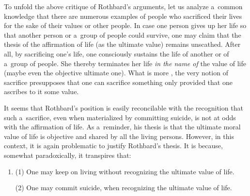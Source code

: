 To unfold the above critique of Rothbard's arguments, let us analyze a~common knowledge that there are numerous examples of people who sacrificed their lives for the sake of their values or other people. In case one person gives up her life so that another person or a~group of people could survive, one may claim that the thesis of the affirmation of life (as the ultimate value) remains unscathed. After all, by sacrificing one's life, one consciously sustains the life of another or of a~group of people. She thereby terminates her life \textit{in the name of} the value of life (maybe even the objective ultimate one). What is more 
\parencites[see][p.1]{}[][p.76]{}, %
 the very notion of sacrifice presupposes that one can sacrifice something only provided that one ascribes to it some value.



It seems that Rothbard's position is easily reconcilable with the recognition that such a~sacrifice, even when materialized by committing suicide, is not at odds with the affirmation of life. As a~reminder, his thesis is that the ultimate moral value of life is objective and shared by all the living persons. However, in this context, it is again problematic to justify Rothbard's thesis. It is because, somewhat paradoxically, it transpires that:



\begin{enumerate}

\item[] (1) One may keep on living without recognizing the ultimate value of life.



(2) One may commit suicide, when recognizing the ultimate value of life.

\end{enumerate}

